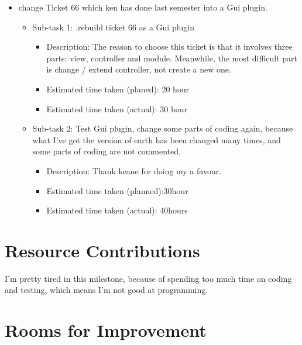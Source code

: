 \documentclass{article}
\begin{document}
\begin{itemize}
\item change Ticket 66 which ken has done last semester into a Gui plugin.
	     \begin{itemize}
              \item Sub-task 1: .rebuild ticket 66 as a Gui plugin
                \begin{itemize}
	         \item Description: The reason to choose this ticket is that it involves three parts: view, controller and module. Meanwhile, the most difficult part is change / extend controller, not create a new one.
	          \item Estimated time taken (planed): 20 hour
                  \item Estimated time taken (actual): 30 hour
	     \end{itemize}
             \end{itemize}

     \begin{itemize}
            \item Sub-task 2: Test Gui plugin, change some parts of coding again, because what I've got the version of earth has been changed many times, and some parts of coding are not commented.
	            \begin{itemize}
				    \item Description: Thank keane for doing my a favour.
					\item Estimated time taken (planned):30hour
					\item Estimated time taken (actual): 40hours
		     \end{itemize}
                     \end{itemize}
  \end{itemize}

\section*{Resource Contributions}

I'm pretty tired in this milestone, because of spending too much time on coding and testing, which means I'm not good at programming.

\section*{Rooms for Improvement}
\end{document}
